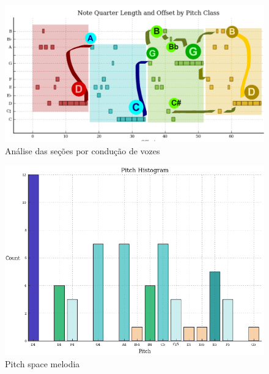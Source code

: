 \documentclass[
	12pt,				%
	openright,			%
	twoside,			%
	a4paper,			%
	english,			%
	french,				%
	spanish,			%
	brazil				%
	]{abntex2}
\begin{document}
\begin{figure}[htb]
	\caption{\label{fig_grafico}Análise das seções por condução de vozes}
	\begin{center}
	    \includegraphics[scale=0.75]{mikro/mikrokosmos113-prolongational.pdf}
	\end{center}
\end{figure}


\begin{figure}[htb]
	\caption{\label{fig_grafico}Pitch space melodia}
	\begin{center}
	    \includegraphics[scale=0.45]{mikro/mikro_melodia_pitch_space.png}
	\end{center}
\end{figure}
\end{document}
